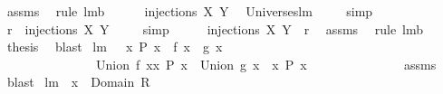 \begin{isabellebody}
\ assms\ \isamarkupfalse%
\ {\isacharparenleft}rule\ lm{}{}b{\isacharparenright}\ \isamarkupfalse%
\ \isamarkupfalse%
\ {\isachardoublequoteopen}{\isachardot}{\isachardot}{\isachardot}\ {\isacharequal}\ injections\ {\isacharquery}X\ Y{\isachardoublequoteclose}\ \isamarkupfalse%
\ Universes{\isachardot}lm{}{}\ \isanewline
\ \ \isamarkupfalse%
\ simp\ \isamarkupfalse%
\ \isamarkupfalse%
\ {\isachardoublequoteopen}{\isacharquery}r\ {\isasymsubseteq}\ injections\ {\isacharquery}X\ Y{\isachardoublequoteclose}\ \isamarkupfalse%
\ {}\ \isamarkupfalse%
\ simp\isanewline
\ \ \isamarkupfalse%
\ \isamarkupfalse%
\ {\isachardoublequoteopen}injections\ {\isacharquery}X\ Y\ {\isasymsubseteq}\ {\isacharquery}r{\isachardoublequoteclose}\ \isamarkupfalse%
\ assms\ \isamarkupfalse%
\ {\isacharparenleft}rule\ lm{}{}b{\isacharparenright}\ \isamarkupfalse%
\ \isamarkupfalse%
\ {\isacharquery}thesis\ \isamarkupfalse%
\ blast\isanewline
{}\isamarkupfalse%
%
\endisatagproof
{\isafoldproof}%
%
\isadelimproof
\isanewline
%
\endisadelimproof
\isanewline
{}\isamarkupfalse%
\ lm{}{}{\isacharcolon}\ \ {\isachardoublequoteopen}{\isasymforall}\ x{\isachardot}\ {\isacharparenleft}P\ x\ {\isasymlongrightarrow}\ {\isacharparenleft}f\ x\ {\isacharequal}\ g\ x{\isacharparenright}{\isacharparenright}{\isachardoublequoteclose}\ \isanewline
\ \ \ \ \ \ \ \ \ \ \ \ \ \ \ {\isachardoublequoteopen}Union\ {\isacharbraceleft}f\ x{\isacharbar}x{\isachardot}\ P\ x{\isacharbraceright}\ {\isacharequal}\ Union\ {\isacharbraceleft}g\ x\ {\isacharbar}\ x{\isachardot}\ P\ x{\isacharbraceright}{\isachardoublequoteclose}\ \isanewline
%
\isadelimproof
\ \ \ \ \ \ \ \ \ \ \ \ %
\endisadelimproof
%
\isatagproof
{}\isamarkupfalse%
\ assms%
\endisatagproof
{\isafoldproof}%
%
\isadelimproof
%
\endisadelimproof
\ \isamarkupfalse%
%
\isadelimproof
\ %
\endisadelimproof
%
\isatagproof
{}\isamarkupfalse%
\ blast%
\endisatagproof
{\isafoldproof}%
%
\isadelimproof
%
\endisadelimproof
\isanewline
\isanewline
{}\isamarkupfalse%
\ lm{}{}{\isacharcolon}\ \ {\isachardoublequoteopen}x\ {\isasymnotin}\ Domain\ R{\isachardoublequoteclose}\ \isanewline

\end{isabellebody}
